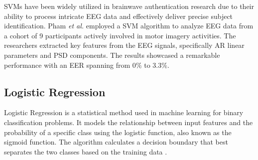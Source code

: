 {%
SVMs have been widely utilized in brainwave authentication research due to their ability to process intricate EEG data and effectively deliver precise subject identification.
Pham \textit{et al.} \cite{pham2013eeg} employed a SVM algorithm to analyze EEG data from a cohort of 9 participants actively involved in motor imagery activities. The researchers extracted key features from the EEG signals, specifically AR linear parameters and PSD components. The results showcased a remarkable performance with an EER spanning from 0$\%$ to 3.3$\%$.  

\subsection{Logistic Regression}
Logistic Regression is a statistical method used in machine learning for binary classification problems. It models the relationship between input features and the probability of a specific class using the logistic function, also known as the sigmoid function. The algorithm calculates a decision boundary that best separates the two classes based on the training data \cite{zabor2022logistic}. 

}
